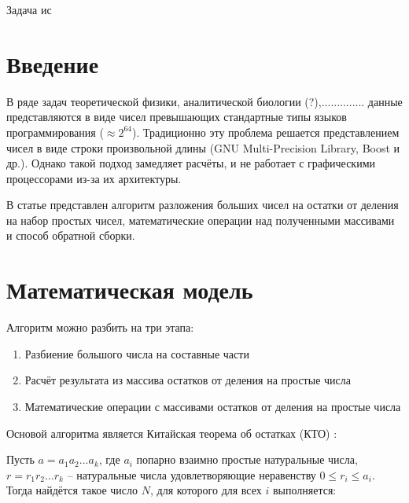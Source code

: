 \documentclass[10pt]{article}
\begin{document}
\makeface



\abstract Задача ис 



\section*{Введение}

В ряде задач теоретической физики, аналитической биологии (?),.............. данные представляются в виде чисел превышающих стандартные типы языков программирования ($\approx 2^{64}$). Традиционно эту проблема решается представлением чисел в виде строки произвольной длины (GNU Multi-Precision Library, Boost и др.). Однако такой подход замедляет расчёты, и не работает с графическими процессорами из-за их архитектуры.

В статье представлен алгоритм разложения больших чисел на остатки от деления на набор простых чисел, математические операции над полученными массивами и способ обратной сборки.

\section{Математическая модель} 

Алгоритм можно разбить на три этапа: 

\begin{enumerate}
	\item Разбиение большого числа на составные части
	\item Расчёт результата из массива остатков от деления на простые числа
	\item Математические операции с массивами остатков от деления на простые числа
\end{enumerate}

Основой алгоритма является Китайская теорема об остатках (КТО) \cite{Cormen2001}:

Пусть $a = a_1 a_2 ... a_k$, где $a_i$ попарно взаимно простые натуральные числа, $r = r_1 r_2 ... r_k$ -- натуральные числа удовлетворяющие неравенству $0 \leq r_i \le a_i$. Тогда найдётся такое число
$N$, для которого для всех $i$ выполняется:
\end{document}
